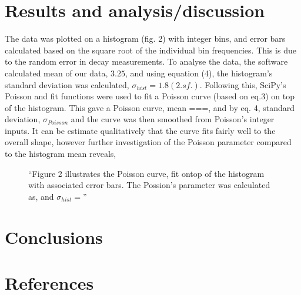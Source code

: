 \documentclass[11pt]{article}
\begin{document}
    \section{Results and analysis/discussion}
    The data was plotted on a histogram (fig. 2) with integer bins, and error bars calculated based on the square root of the individual bin frequencies. This is due to the random error in decay measurements. 
    \newline
    To analyse the data, the software calculated mean of our data, $3.25$, and using equation (4), the histogram's standard deviation was calculated, $\sigma_{hist} = 1.8 (2.sf.)$. Following this, SciPy's Poisson and fit functions were used to fit a Poisson curve (based on eq.3) on top of the histogram. This gave a Poisson curve, mean ===, and by eq. 4, standard deviation, $\sigma_{Poisson}$ and the curve was then smoothed from Poisson's integer inputs. 
    It can be estimate qualitatively that the curve fits fairly well to the overall shape, however further investigation of the Poisson parameter compared to the histogram mean reveals, 
       \begin{figure}[]
        \begin{center}
            \def\svgwidth{\columnwidth}
            
             \caption{“Figure 2 illustrates the Poisson curve, fit ontop of the histogram with associated error bars. The Possion's parameter was calculated as, and $\sigma_{hist} = $”}
             \label{fig:experimental results 1}
        \end{center}
    \end{figure}
    \section{Conclusions}
    \section{References}
\end{document}
